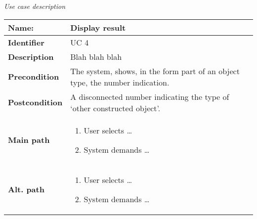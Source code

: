 \documentclass{article}
\newcommand\addrow[2]{#1 &#2\\ }
\newcommand\addheading[2]{#1 &#2\\ \hline}
\newcommand\tabularhead{\begin{tabular}{lp{10cm}}
\hline
}
\newcommand\addmulrow[2]{ \begin{minipage}[t][][t]{2.5cm}#1\end{minipage}%
   &\begin{minipage}[t][][t]{10cm}
    \begin{enumerate} #2   \end{enumerate}
    \end{minipage}\\ }
\newenvironment{usecase}{\tabularhead}
{\hline\end{tabular}}
\begin{document}
{\Large\textit{Use case description}} \\
\begin{usecase}
  \addheading{\textbf{Name:}}{Display result}
  \addheading{\textbf{Identifier}}{UC 4}
  \addrow{\textbf{Description}}{Blah blah blah}
  \addrow{\textbf{Precondition}}{The system, shows, in the form part of an object type, the number   indication.}
  \addrow{\textbf{Postcondition}}{A disconnected number indicating the type of `other constructed object'.}
  \addmulrow{\textbf{Main path}}{
  	\item User selects \ldots
    \item System demands \ldots}
  \addmulrow{\textbf{Alt. path}}{
  	\item User selects \ldots
    \item System demands \ldots}
\end{usecase}
\end{document}
